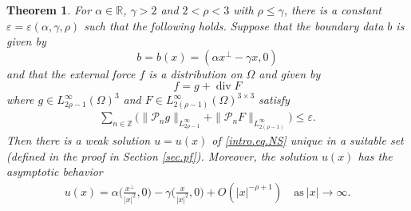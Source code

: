 \documentclass[11pt,a4paper]{article}
\numberwithin{equation}{section}
\newtheorem{theorem}{Theorem}[section]
\newcommand{\Z}{\mathbb{Z}}
\newcommand{\R}{\mathbb{R}}
\newcommand{\opdiv}{\operatorname{div}}
\begin{document}
%
\begin{theorem}\label{thm.main}
For $\alpha\in\R$, $\gamma>2$ and $2<\rho<3$ with $\rho\le\gamma$, there is a constant $\varepsilon=\varepsilon(\alpha,\gamma,\rho)$ such that the following holds. Suppose that the boundary data $b$ is given by 
\[
b = b(x) = (\alpha x^{\bot} - \gamma x,0)
\]
and that the external force $f$ is a distribution on $\Omega$ and given by 
\[
f = g + \opdiv F 
\]
where $g\in L^\infty_{2\rho-1}(\Omega)^3$ and $F\in L^\infty_{2(\rho-1)}(\Omega)^{3\times3}$ satisfy 
%
\begin{align*}
\sum_{n\in\Z} 
\big(
\|\mathcal{P}_n g\|_{L^\infty_{2\rho-1}} 
+ 
\|\mathcal{P}_n F\|_{L^\infty_{2(\rho-1)}}
\big)
\le 
\varepsilon. 
\end{align*}
%
Then there is a weak solution $u=u(x)$ of \eqref{intro.eq.NS} unique in a suitable set (defined in the proof in Section \ref{sec.pf}). Moreover, the solution $u(x)$ has the asymptotic behavior 
%
\begin{align}\label{est1.thm.main} 
u(x) 
= 
\alpha \Big(\frac{x^{\bot}}{|x|^2},0\Big)
- \gamma \Big(\frac{x}{|x|^2}, 0\Big)
+ O(|x|^{-\rho+1})
\quad 
\mbox{as}\ |x|\to\infty. 
\end{align}
%
\end{theorem}
%
\end{document}
